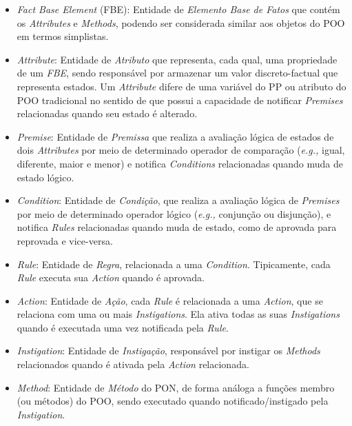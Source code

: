 \begin{itemize}
  \item \textit{Fact Base Element} (FBE): Entidade de \textit{Elemento Base de
          Fatos} que contém os \textit{Attributes} e \textit{Methods}, podendo ser
        considerada similar aos objetos do POO em termos simplistas.
  \item \textit{Attribute}: Entidade de \textit{Atributo} que representa, cada
        qual, uma propriedade de um \textit{FBE}, sendo responsável por armazenar um
        valor discreto-factual que representa estados. Um \textit{Attribute} difere de
        uma variável do PP ou atributo do POO tradicional no sentido de que possui a
        capacidade de notificar \textit{Premises} relacionadas quando seu estado é
        alterado.
  \item \textit{Premise}: Entidade de \textit{Premissa} que realiza a avaliação
        lógica de estados de dois \textit{Attributes} por meio de determinado operador
        de comparação (\textit{e.g.,} igual, diferente, maior e menor) e notifica
        \textit{Conditions} relacionadas quando muda de estado lógico.
  \item \textit{Condition}: Entidade de \textit{Condição}, que realiza a
        avaliação lógica de \textit{Premises} por meio de determinado operador lógico
        (\textit{e.g.,} conjunção ou disjunção), e notifica \textit{Rules} relacionadas
        quando muda de estado, como de aprovada para reprovada e vice-versa.
  \item \textit{Rule}: Entidade de \textit{Regra}, relacionada a uma
        \textit{Condition}. Tipicamente, cada \textit{Rule} executa sua \textit{Action}
        quando é aprovada.
  \item \textit{Action}: Entidade de \textit{Ação}, cada \textit{Rule} é
        relacionada a uma \textit{Action}, que se relaciona com uma ou mais
        \textit{Instigations}. Ela ativa todas as suas \textit{Instigations} quando é
        executada uma vez notificada pela \textit{Rule}.
  \item \textit{Instigation}: Entidade de \textit{Instigação}, responsável por
        instigar os \textit{Methods} relacionados quando é ativada pela \textit{Action}
        relacionada.
  \item \textit{Method}: Entidade de \textit{Método} do PON, de forma análoga a
        funções membro (ou métodos) do POO, sendo executado quando notificado/instigado
        pela \textit{Instigation}.
\end{itemize}

